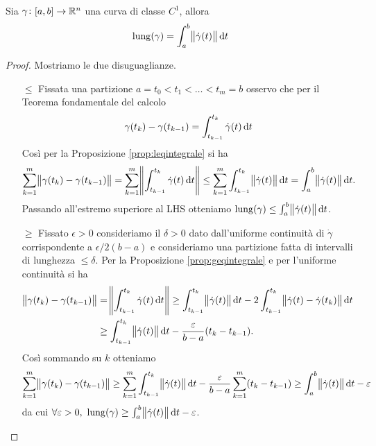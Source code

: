 \begin{thm} \label{thm:lungcurvaC1}
	Sia $ \gamma \colon [a, b] \to \mathbb{R}^n $ una curva di classe $ C^1 $, allora
	\begin{equation}
		\mathrm{lung}(\gamma) = \int_{a}^{b} \norm{\dot{\gamma}(t)} \dif{t}
	\end{equation}
\end{thm}
%
\begin{proof}
	Mostriamo le due disuguaglianze.
	\begin{enumerate}
		\item[$ \leq $] Fissata una partizione $ a = t_0 < t_1 < \ldots < t_m = b $ osservo che per il Teorema fondamentale del calcolo
		\[
			\gamma(t_k) - \gamma(t_{k - 1}) = \int_{t_{k - 1}}^{t_k} \dot{\gamma}(t) \dif{t}
		\]
		Così per la Proposizione \ref{prop:leqintegrale} si ha
		\[
			\sum_{k = 1}^{m} \norm{\gamma(t_k) - \gamma(t_{k - 1})} = \sum_{k = 1}^{m} \norm{\int_{t_{k - 1}}^{t_k} \dot{\gamma}(t) \dif{t}} \leq \sum_{k = 1}^{m} \int_{t_{k - 1}}^{t_k} \norm{\dot{\gamma}(t)} \dif{t} = \int_{a}^{b} \norm{\dot{\gamma}(t)} \dif{t}.
		\]
		Passando all'estremo superiore al LHS otteniamo $ \mathrm{lung}(\gamma) \leq \int_{a}^{b} \norm{\dot{\gamma}(t)} \dif{t} $.
		\item[$ \geq $] Fissato $ \epsilon > 0 $ consideriamo il $ \delta > 0 $ dato dall'uniforme continuità di $ \dot{\gamma} $ corrispondente a $ \epsilon / 2(b - a) $ e consideriamo una partizione fatta di intervalli di lunghezza $ \leq \delta $. Per la Proposizione \ref{prop:geqintegrale}  e per l'uniforme continuità si ha
		\begin{align*}
			\norm{\gamma(t_k) - \gamma(t_{k - 1})} & = \norm{\int_{t_{k - 1}}^{t_k} \dot{\gamma}(t) \dif{t}} \geq \int_{t_{k - 1}}^{t_k} \norm{\dot{\gamma}(t)} \dif{t} - 2 \int_{t_{k - 1}}^{t_k} \norm{\dot{\gamma}(t) - \dot{\gamma}(t_k)}\dif{t} \\
			& \geq \int_{t_{k - 1}}^{t_k} \norm{\dot{\gamma}(t)} \dif{t} - \frac{\epsilon}{b - a} (t_k - t_{k - 1}).
		\end{align*}
		Così sommando su $ k $ otteniamo
		\[
			\sum_{k = 1}^{m} \norm{\gamma(t_k) - \gamma(t_{k - 1})} \geq \sum_{k = 1}^{m} \int_{t_{k - 1}}^{t_k} \norm{\dot{\gamma}(t)} \dif{t} - \frac{\epsilon}{b - a} \sum_{k = 1}^{m}(t_k - t_{k - 1}) \geq \int_{a}^{b} \norm{\dot{\gamma}(t)} \dif{t} - \epsilon
		\]
		da cui $ \forall \epsilon > 0, \ \mathrm{lung}(\gamma) \geq \int_{a}^{b} \norm{\dot{\gamma}(t)} \dif{t} - \epsilon $. \qedhere
	\end{enumerate}
\end{proof}


